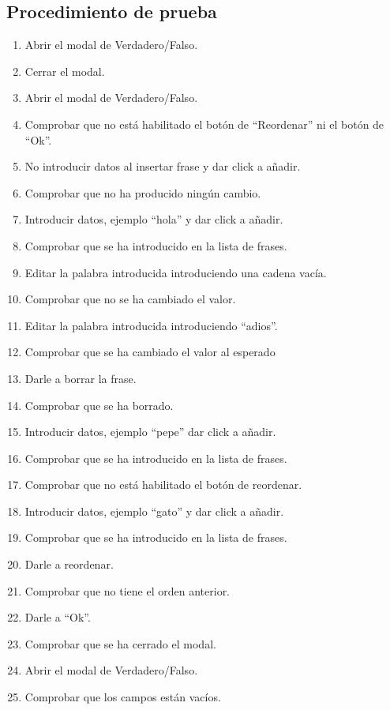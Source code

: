 \subsection{Procedimiento de prueba}
\label{procedimientoPruebas:v/f}
\begin{enumerate}
    \item Abrir el modal de Verdadero/Falso.
    \item Cerrar el modal.
    \item Abrir el modal de Verdadero/Falso.
    \item Comprobar que no está habilitado el botón de ``Reordenar'' ni el botón de ``Ok''.
    \item No introducir datos al insertar frase y dar click a añadir.
    \item Comprobar que no ha producido ningún cambio.
    \item Introducir datos, ejemplo ``hola'' y dar click a añadir.
    \item Comprobar que se ha introducido en la lista de frases.
    \item Editar la palabra introducida introduciendo una cadena vacía.
    \item Comprobar que no se ha cambiado el valor.
    \item Editar la palabra introducida introduciendo ``adios''.
    \item Comprobar que se ha cambiado el valor al esperado
    \item Darle a borrar la frase.
    \item Comprobar que se ha borrado.
    \item Introducir datos, ejemplo ``pepe'' dar click a añadir.
    \item Comprobar que se ha introducido en la lista de frases.
    \item Comprobar que no está habilitado el botón de reordenar.
    \item Introducir datos, ejemplo ``gato'' y dar click a añadir.
    \item Comprobar que se ha introducido en la lista de frases.
    \item Darle a reordenar.
    \item Comprobar que no tiene el orden anterior.
    \item Darle a ``Ok''.
    \item Comprobar que se ha cerrado el modal.
    \item Abrir el modal de Verdadero/Falso.
    \item Comprobar que los campos están vacíos.
\end{enumerate}

